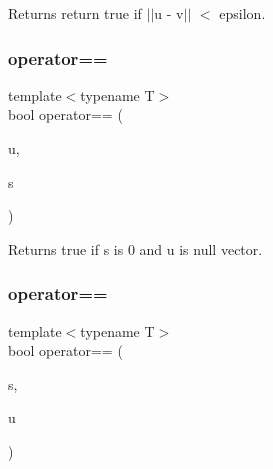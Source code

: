 \begin{DoxyReturn}{Returns}
return true if $\vert$$\vert$u -\/ v$\vert$$\vert$ $<$ epsilon. 
\end{DoxyReturn}
\mbox{\label{class_n_vector_aaffc8825c70b5e498690e0882d202a65}} 
\subsubsection{\texorpdfstring{operator==}{operator==}\hspace{0.1cm}{\footnotesize\ttfamily [2/3]}}
{\footnotesize\ttfamily template$<$typename T$>$ \\
bool operator== (\begin{DoxyParamCaption}\item[{const \mbox{\hyperlink{class_n_vector}{N\+Vector}}$<$ T $>$ \&}]{u,  }\item[{T}]{s }\end{DoxyParamCaption})\hspace{0.3cm}{\ttfamily [friend]}}

\begin{DoxyReturn}{Returns}
true if s is 0 and u is null vector. 
\end{DoxyReturn}
\mbox{\label{class_n_vector_a4f2b795f34a0a21dfcc146ba02899a1b}} 
\subsubsection{\texorpdfstring{operator==}{operator==}\hspace{0.1cm}{\footnotesize\ttfamily [3/3]}}
{\footnotesize\ttfamily template$<$typename T$>$ \\
bool operator== (\begin{DoxyParamCaption}\item[{T}]{s,  }\item[{const \mbox{\hyperlink{class_n_vector}{N\+Vector}}$<$ T $>$ \&}]{u }\end{DoxyParamCaption})\hspace{0.3cm}{\ttfamily [friend]}}

\mbox{\label{class_n_vector_adf3470a73ee508e6b7292bdaed2d13ba}} 
